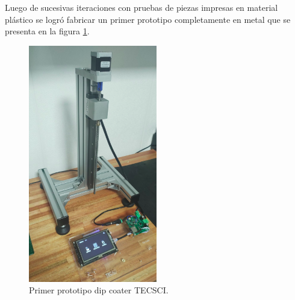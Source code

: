 
Luego de sucesivas iteraciones con pruebas de piezas impresas en material plástico se logró fabricar un primer prototipo completamente en metal que se presenta en la figura \ref{fig:mecanica_real_model}.

\begin{figure}[h]
	\centering
	\includegraphics[width=0.5\textwidth]{./Figures/real.png}
	\caption{Primer prototipo dip coater TECSCI.}
	\label{fig:mecanica_real_model}
\end{figure}

